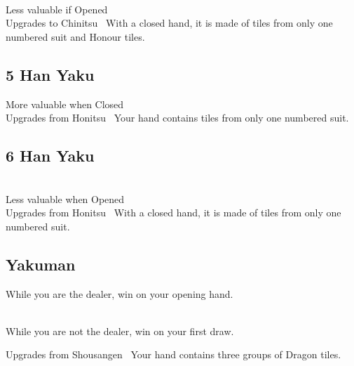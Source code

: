 	{\closedhand \\
	\morevaluable Less valuable if Opened~\\
	\upgradesto Upgrades to Chinitsu~}
	{With a closed hand, it is made of tiles from only one numbered suit and Honour tiles.}


\subsection{5 Han Yaku}\label{core:ssec:5-han-yaku}

	{\morevaluable More valuable when Closed~ \\
	\upgradesfrom Upgrades from Honitsu~}
	{Your hand contains tiles from only one numbered suit.}


\subsection{6 Han Yaku}\label{core:ssec:6-han-yaku}

	{\closedhand \\
	\lessvaluable Less valuable when Opened~ \\
	\upgradesfrom Upgrades from Honitsu~}
	{With a closed hand, it is made of tiles from only one numbered suit.}

\subsection{Yakuman}\label{core:ssec:yakuman-yaku}

	{\closedhand}
	{While you are the dealer, win on your opening hand.}

	{\closedhand \\
	\brokenhand}
	{While you are not the dealer, win on your first draw.}

	{\upgradesfrom Upgrades from Shousangen~}
	{Your hand contains three groups of Dragon tiles.}


